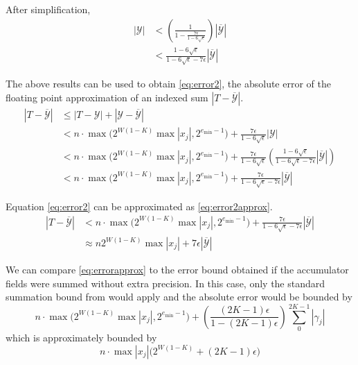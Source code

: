     After simplification,
    \begin{align*}
      |\mathcal{Y}| &< \left(\frac{1}{1 - \frac{7\epsilon}{1 - 6\sqrt\epsilon}}\right)  \left|\overline{\mathcal{Y}}\right| \nonumber \\
      &< \frac{1 - 6 \sqrt\epsilon}{1 - 6 \sqrt \epsilon - 7\epsilon}  \left|\overline{\mathcal{Y}}\right|
    \end{align*}

    The above results can be used to obtain  \eqref{eq:error2}, the absolute
    error of the floating point approximation of an indexed sum $|T -
    \overline{\mathcal{Y}}|$.
    \begin{align}
      \left|T - \overline{\mathcal{Y}}\right| &\leq |T - \mathcal{Y}| + \left|\mathcal{Y} - \overline{\mathcal{Y}}\right| \nonumber \\
      &< n \cdot \max\bigl(2^{W(1-K)}  \max|x_j|, 2^{e_{\min} - 1}\bigr) + \frac{7\epsilon}{1 - 6\sqrt\epsilon}|\mathcal{Y}| \nonumber \\
      &< n \cdot \max\bigl(2^{W(1-K)}  \max|x_j|, 2^{e_{\min} - 1}\bigr) + \frac{7\epsilon}{1 - 6\sqrt\epsilon}\left(\frac{1 - 6 \sqrt\epsilon}{1 - 6 \sqrt \epsilon - 7\epsilon}\left|\overline{\mathcal{Y}}\right|\right) \nonumber \\
      &< n \cdot \max\bigl(2^{W(1-K)}  \max|x_j|, 2^{e_{\min} - 1}\bigr) + \frac{7\epsilon}{1 - 6 \sqrt \epsilon - 7\epsilon}\left|\overline{\mathcal{Y}}\right|
      \label{eq:error2}
    \end{align}

    Equation \eqref{eq:error2} can be approximated as  \eqref{eq:error2approx}.
    \begin{align}
      |T - \overline{\mathcal{Y}}| &< n \cdot \max\bigl(2^{W(1-K)}  \max|x_j|, 2^{e_{\min} - 1}\bigr) + \frac{7\epsilon}{1 - 6 \sqrt \epsilon - 7\epsilon}  \left|\overline{\mathcal{Y}}\right| \nonumber \\
      &\approx n  2^{W(1 - K)} \max|x_j|+ 7 \epsilon \left|\overline{\mathcal{Y}}\right|
      \label{eq:error2approx}
    \end{align}

    We can compare  \eqref{eq:errorapprox} to the error bound obtained if the
    accumulator fields were summed without extra precision. In this case, only
    the standard summation bound from \cite{higham} would apply and the
    absolute error would be bounded by
    \begin{equation*}
    n \cdot \max\bigl(2^{W(1-K)}  \max|x_j|, 2^{e_{\min} - 1}\bigr) + \left(\frac{(2  K - 1)  \epsilon}{1 - (2  K - 1)  \epsilon}\right)  \sum\limits_0^{2  K - 1}|\gamma_j|
    \end{equation*}
    which is approximately bounded by
    \begin{equation}
    n \cdot \max|x_j| \bigl(2^{W(1-K)} + (2  K - 1)  \epsilon\bigr)
    \label{eq:baderrorapprox}
    \end{equation}

